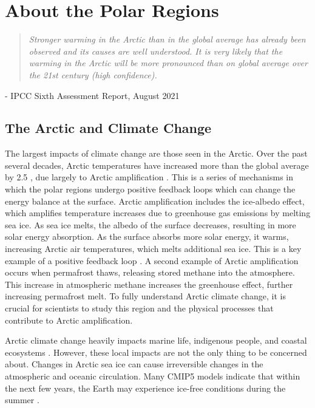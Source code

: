 \chapter{About the Polar Regions}
\vspace{1 cm}
\begin{spacing}{1} \begin{quote} 
\noindent \emph{Stronger warming in the Arctic than in the global average has already been observed and its causes are well understood. It is very likely that the warming in the Arctic will be more pronounced than on global average over the 21st century (high confidence).} \end{quote}
\hspace{6 cm} - IPCC Sixth Assessment Report, August 2021  
\end{spacing}
\vspace{1 cm}


\section{The Arctic and Climate Change}
The largest impacts of climate change are those seen in the Arctic. Over the past several decades, Arctic temperatures have increased more than the global average by 2.5 \citep{tjernstrom:2014a}, due largely to Arctic amplification \citep{rantanen:2022}. This is a series of mechanisms in which the polar regions undergo positive feedback loops which can change the energy balance at the surface. Arctic amplification includes the ice-albedo effect, which amplifies temperature increases due to greenhouse gas emissions by melting sea ice. As sea ice melts, the albedo of the surface decreases, resulting in more solar energy absorption. As the surface absorbs more solar energy, it warms, increasing Arctic air temperatures, which melts additional sea ice. This is a key example of a positive feedback loop \citep{ipcc_techsum}. A second example of Arctic amplification occurs when permafrost thaws, releasing stored methane into the atmosphere. This increase in atmospheric methane increases the greenhouse effect, further increasing permafrost melt. To fully understand Arctic climate change, it is crucial for scientists to study this region and the physical processes that contribute to Arctic amplification.

Arctic climate change heavily impacts marine life, indigenous people, and coastal ecosystems \citep{ipcc_techsum}. However, these local impacts are not the only thing to be concerned about. Changes in Arctic sea ice can cause irreversible changes in the atmospheric and oceanic circulation. Many CMIP5 models indicate that within the next few years,  the Earth may experience ice-free conditions during the summer \citep{stroeve:2018}.


